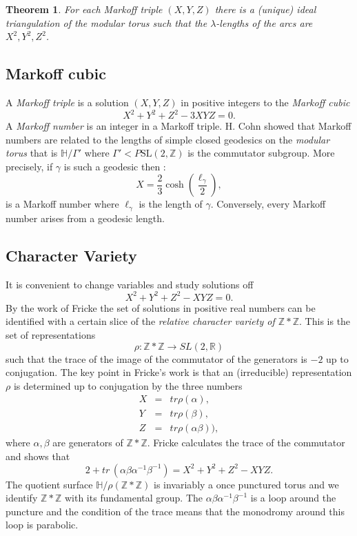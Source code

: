 \documentclass[12pt,a4paper]{amsart}
\newtheorem{thm}{Theorem}[section]
\def\HH{\mathbb{H}}
\def\ZZ{\mathbb{Z}}
\def\RR{\mathbb{R}}
\def\sl2{\mathrm{SL}(2, \ZZ)}
\begin{document}
\begin{thm}
For each  Markoff triple $(X,Y,Z)$
there is a (unique) ideal triangulation of the modular torus
such that the $\lambda$-lengths of the arcs are 
$X^2,Y^2,Z^2$.
\end{thm}

\subsection{Markoff cubic}

A \textit{Markoff triple} is a  solution $(X,Y,Z)$  in positive integers to
the \textit{Markoff cubic}
\begin{equation}\label{m cubic}
X^2 + Y^2 + Z^2 - 3XYZ = 0.
\end{equation}
A \textit{Markoff number} is an integer in a Markoff triple.
H. Cohn showed that Markoff numbers are related to the 
lengths of simple closed geodesics on the \textit{modular torus}
that is $\HH/\Gamma'$ 
where $\Gamma' < P\sl2$ is the commutator subgroup.
More precisely, if $\gamma$ is such a geodesic then :
\begin{equation}
X  = \frac{2}{3} \cosh \left( \frac{\ell_\gamma}{2}\right),
\end{equation}
is a Markoff number where $\ell_\gamma$ is the length of $\gamma$.
Conversely, every Markoff number arises from a geodesic length.

\subsection{Character Variety}

It is convenient to change variables and study solutions off
\begin{equation}\label{f cubic}
X^2 + Y^2 + Z^2 - XYZ = 0.
\end{equation}
By the work of Fricke the set of solutions in positive real numbers
can be identified with a certain slice of the 
\textit{relative character variety of $\ZZ * \ZZ$}.
This is the set of  representations 
$$\rho: \ZZ * \ZZ \rightarrow SL(2, \RR)$$
such that the trace of the image of the commutator of the generators is $-2$
up to conjugation.
The key point in Fricke's work is that an (irreducible) representation $\rho$
is determined up to conjugation by the three numbers
\begin{eqnarray*}
X &= &tr \rho(\alpha), \\
Y  &= &tr \rho(\beta), \\
Z &= & tr \rho(\alpha\beta)),
\end{eqnarray*}
where $\alpha,\beta$ are generators of $\ZZ*\ZZ$.
Fricke calculates the trace of the commutator and shows that
\begin{equation}
2 + tr\,  (\alpha\beta\alpha^{-1}\beta^{-1}) = X^2 + Y^2 + Z^2 - XYZ .
\end{equation}
The quotient surface $\HH/\rho(\ZZ*\ZZ)$ is invariably a once punctured torus
and we identify $\ZZ * \ZZ$ with its fundamental group.
The $\alpha\beta\alpha^{-1}\beta^{-1}$ is a loop around the puncture
and the condition of the trace means that the monodromy around this loop is parabolic.
\end{document}

